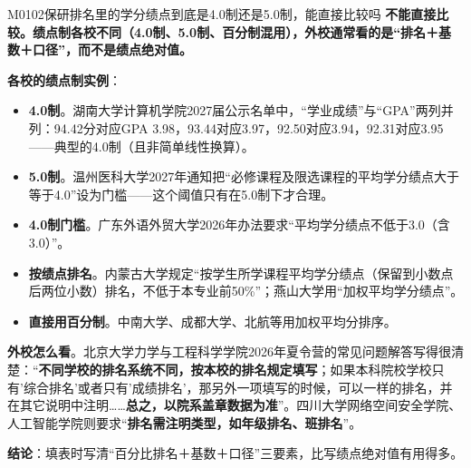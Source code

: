 \begin{qa}{M0102}{保研排名里的学分绩点到底是4.0制还是5.0制，能直接比较吗}
\textbf{不能直接比较。绩点制各校不同（4.0制、5.0制、百分制混用），外校通常看的是“排名＋基数＋口径”，而不是绩点绝对值。}

\textbf{各校的绩点制实例}：

\begin{itemize}
  \item \textbf{4.0制}。湖南大学计算机学院2027届公示名单中，“学业成绩”与“GPA”两列并列：94.42分对应GPA 3.98，93.44对应3.97，92.50对应3.94，92.31对应3.95——典型的4.0制（且非简单线性换算）。
  \item \textbf{5.0制}。温州医科大学2027年通知把“必修课程及限选课程的平均学分绩点大于等于4.0”设为门槛——这个阈值只有在5.0制下才合理。
  \item \textbf{4.0制门槛}。广东外语外贸大学2026年办法要求“平均学分绩点不低于3.0（含3.0）”。
  \item \textbf{按绩点排名}。内蒙古大学规定“按学生所学课程平均学分绩点（保留到小数点后两位小数）排名，不低于本专业前50\%”；燕山大学用“加权平均学分绩点”。
  \item \textbf{直接用百分制}。中南大学、成都大学、北航等用加权平均分排序。
\end{itemize}

\textbf{外校怎么看}。北京大学力学与工程科学学院2026年夏令营的常见问题解答写得很清楚：“\textbf{不同学校的排名系统不同，按本校的排名规定填写}；如果本科院校学校只有'综合排名'或者只有'成绩排名'，那另外一项填写的时候，可以一样的排名，并在其它说明中注明……\textbf{总之，以院系盖章数据为准}”。四川大学网络空间安全学院、人工智能学院则要求“\textbf{排名需注明类型，如年级排名、班排名}”。

\textbf{结论}：填表时写清“百分比排名＋基数＋口径”三要素，比写绩点绝对值有用得多。
\end{qa}

